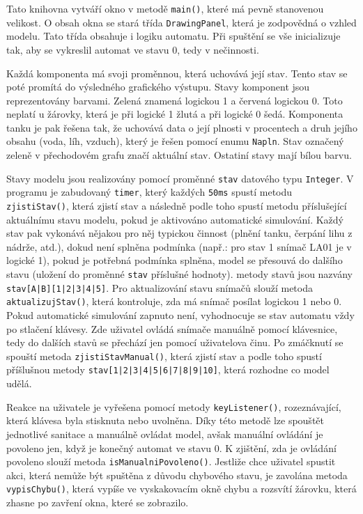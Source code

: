\documentclass[12pt, a4paper]{article}
\begin{document}
\vspace{0.25cm}
Tato knihovna vytváří okno v metodě \texttt{main()}, které má pevně stanovenou velikost. O obsah okna se stará třída \texttt{DrawingPanel}, která je zodpovědná o vzhled modelu. Tato třída obsahuje i logiku automatu. Při spuštění se vše inicializuje tak, aby se vykreslil automat ve stavu 0, tedy v nečinnosti.

\vspace{0.25cm}
Každá komponenta má svoji proměnnou, která uchovává její stav. Tento stav se poté promítá do výsledného grafického výstupu. Stavy komponent jsou reprezentovány barvami. Zelená znamená logickou 1 a červená logickou 0. Toto neplatí u žárovky, která je při logické 1 žlutá a při logické 0 šedá. Komponenta tanku je pak řešena tak, že uchovává data o její plnosti v procentech a druh jejího obsahu (voda, líh, vzduch), který je řešen pomocí enumu \texttt{Napln}. Stav označený zeleně v přechodovém grafu značí aktuální stav. Ostatiní stavy mají bílou barvu.

\vspace{0.25cm}
Stavy modelu jsou realizovány pomocí proměnné \texttt{stav} datového typu \texttt{Integer}. V programu je zabudovaný \texttt{timer}, který každých \texttt{50ms} spustí metodu \newline \texttt{zjistiStav()}, která zjistí stav a následně podle toho spustí metodu příslušející aktuálnímu stavu modelu, pokud je aktivováno automatické simulování. Každý stav pak vykonává nějakou pro něj typickou činnost (plnění tanku, čerpání lihu z nádrže, atd.), dokud není splněna podmínka (např.: pro stav 1 snímač LA01 je v logické 1), pokud je potřebná podmínka splněna, model se přesouvá do dalšího stavu (uložení do proměnné \texttt{stav} příslušné hodnoty). metody stavů jsou nazvány \texttt{stav[A|B][1|2|3|4|5]}. Pro aktualizování stavu snímačů slouží metoda \texttt{aktualizujStav()}, která kontroluje, zda má snímač posílat logickou 1 nebo 0. Pokud automatické simulování zapnuto není, vyhodnocuje se stav automatu vždy po stlačení klávesy. Zde uživatel ovládá snímače manuálně pomocí klávesnice, tedy do dalších stavů se přechází jen pomocí uživatelova činu. Po zmáčknutí se spouští metoda \texttt{zjistiStavManual()}, která zjistí stav a podle toho spustí příšlušnou metody \texttt{stav[1|2|3|4|5|6|7|8|9|10]}, která rozhodne co model udělá. 

\vspace{0.25cm}
Reakce na uživatele je vyřešena pomocí metody \texttt{keyListener()}, rozeznávající, která klávesa byla stisknuta nebo uvolněna. Díky této metodě lze spouštět jednotlivé sanitace a manuálně ovládat model, avšak manuální ovládání je povoleno jen, když je konečný automat ve stavu 0. K zjištění, zda je ovládání povoleno slouží metoda \texttt{isManualniPovoleno()}. Jestliže chce uživatel spustit akci, která nemůže být spuštěna z důvodu chybového stavu, je zavolána metoda \texttt{vypisChybu()}, která vypíše ve vyskakovacím okně chybu a rozsvítí žárovku, která zhasne po zavření okna, které se zobrazilo.
\end{document}
